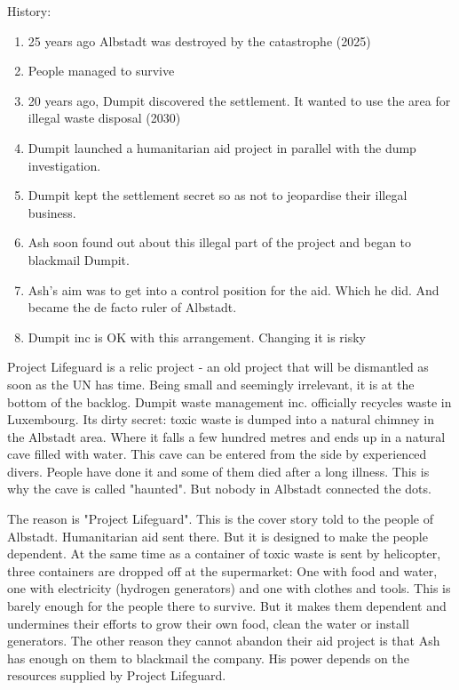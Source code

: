 History:
\begin{enumerate}
    \item 25 years ago Albstadt was destroyed by the catastrophe (2025)
    \item People managed to survive
    \item 20 years ago, Dumpit discovered the settlement. It wanted to use the area for illegal waste disposal (2030)
    \item Dumpit launched a humanitarian aid project in parallel with the dump investigation.
    \item Dumpit kept the settlement secret so as not to jeopardise their illegal business.
    \item Ash soon found out about this illegal part of the project and began to blackmail Dumpit.
    \item Ash's aim was to get into a control position for the aid. Which he did. And became the de facto ruler of Albstadt.
    \item Dumpit inc is OK with this arrangement. Changing it is risky
\end{enumerate}

Project Lifeguard is a relic project - an old project that will be dismantled as soon as the UN has time. Being small and seemingly irrelevant, it is at the bottom of the backlog.
Dumpit waste management inc. officially recycles waste in Luxembourg. Its dirty secret: toxic waste is dumped into a natural chimney in the Albstadt area. Where it falls a few hundred metres and ends up in a natural cave filled with water. This cave can be entered from the side by experienced divers. People have done it and some of them died after a long illness. This is why the cave is called "haunted". But nobody in Albstadt connected the dots.

The reason is "Project Lifeguard". This is the cover story told to the people of Albstadt. Humanitarian aid sent there. But it is designed to make the people dependent. At the same time as a container of toxic waste is sent by helicopter, three containers are dropped off at the supermarket: One with food and water, one with electricity (hydrogen generators) and one with clothes and tools.
This is barely enough for the people there to survive. But it makes them dependent and undermines their efforts to grow their own food, clean the water or install generators.
The other reason they cannot abandon their aid project is that Ash has enough on them to blackmail the company. His power depends on the resources supplied by Project Lifeguard.

